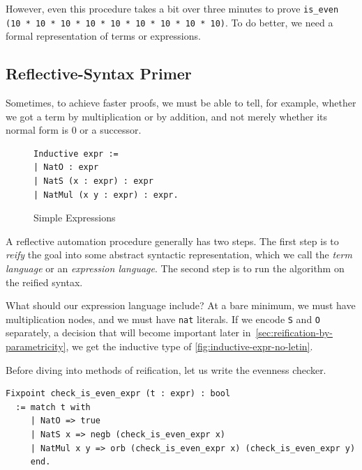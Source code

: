 However, even this procedure takes a bit over three minutes to prove \texttt{is\_even (10 * 10 * 10 * 10 * 10 * 10 * 10 * 10 * 10)}.
To do better, we need a formal representation of terms or expressions.

\subsection{Reflective-Syntax Primer}
Sometimes, to achieve faster proofs, we must be able to tell, for example, whether we got a term by multiplication or by addition, and not merely whether its normal form is 0 or a successor.%

\begin{figure}
\begin{verbatim}
Inductive expr :=
| NatO : expr
| NatS (x : expr) : expr
| NatMul (x y : expr) : expr.
\end{verbatim}
\caption{Simple Expressions}\label{fig:inductive-expr-no-letin}
\end{figure}

A reflective automation procedure generally has two steps.
The first step is to \emph{reify} the goal into some abstract syntactic representation, which we call the \emph{term language} or an \emph{expression language}.
The second step is to run the algorithm on the reified syntax.

What should our expression language include?
At a bare minimum, we must have multiplication nodes, and we must have \texttt{nat} literals.
If we encode \texttt{S} and \texttt{O} separately, a decision that will become important later in~\autoref{sec:reification-by-parametricity}, we get the inductive type of \autoref{fig:inductive-expr-no-letin}.

Before diving into methods of reification, let us write the evenness checker.
\begin{verbatim}
Fixpoint check_is_even_expr (t : expr) : bool
  := match t with
     | NatO => true
     | NatS x => negb (check_is_even_expr x)
     | NatMul x y => orb (check_is_even_expr x) (check_is_even_expr y)
     end.
\end{verbatim}

